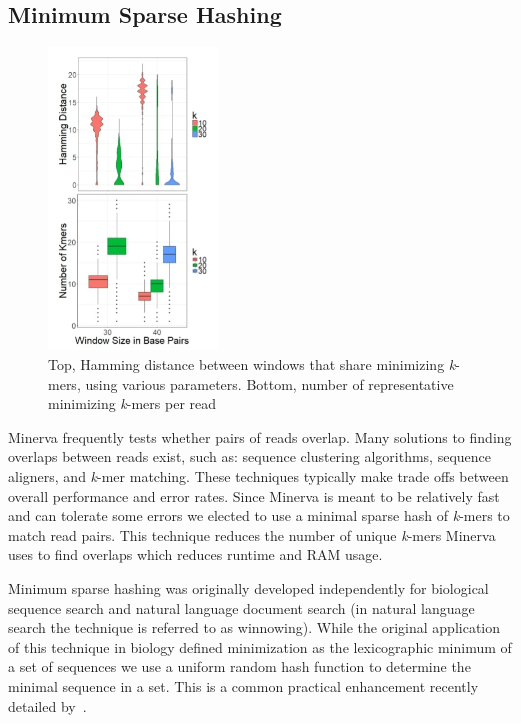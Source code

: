 \subsection*{ Minimum Sparse Hashing}
\label{sec:MSH}

\begin{figure}%
  \begin{center}
   \includegraphics[width=0.4\textwidth]{figures/minsparse_fig.jpg}
	\caption{\small{Top, Hamming distance between windows that share minimizing \textit{k}-mers, using various parameters. Bottom, number of representative minimizing \textit{k}-mers per read}}
    \label{fig:minsparse_fig}
  \end{center}
\end{figure}

Minerva frequently tests whether pairs of reads overlap. Many solutions to finding overlaps between reads exist, such as: sequence clustering algorithms, sequence aligners, and \textit{k}-mer matching. These techniques typically make trade offs between overall performance and error rates. Since Minerva is meant to be relatively fast and can tolerate some errors we elected to use a minimal sparse hash of \textit{k}-mers to match read pairs. This technique reduces the number of unique \textit{k}-mers Minerva uses to find overlaps which reduces runtime and RAM usage.

Minimum sparse hashing was originally developed independently for biological sequence search and natural language document search \citep{Marcais2017,Schleimer2003} (in natural language search the technique is referred to as winnowing). While the original application of this technique in biology defined minimization as the lexicographic minimum of a set of sequences we use a uniform random hash function to determine the minimal sequence in a set. This is a common practical enhancement recently detailed by~\citep{Orenstein2016}. 


